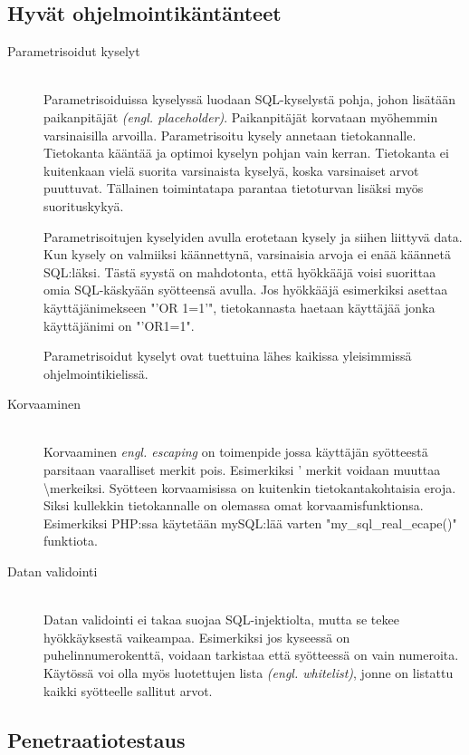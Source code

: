 \documentclass[finnish]{tktltiki2}
\theoremstyle{definition}
\theoremstyle{remark}
\begin{document}
	\subsection{Hyvät ohjelmointikäntänteet}
	\begin{description}
		\item[Parametrisoidut kyselyt ] \hfill \\
		Parametrisoiduissa kyselyssä luodaan SQL-kyselystä pohja, johon lisätään paikanpitäjät \textit{(engl. placeholder)}. Paikanpitäjät korvataan myöhemmin varsinaisilla arvoilla. Parametrisoitu kysely annetaan tietokannalle. Tietokanta kääntää ja optimoi kyselyn pohjan vain kerran. Tietokanta ei kuitenkaan vielä suorita varsinaista kyselyä, koska varsinaiset arvot puuttuvat. Tällainen toimintatapa parantaa tietoturvan lisäksi myös suorituskykyä.
		
		Parametrisoitujen kyselyiden avulla erotetaan kysely ja siihen liittyvä data. Kun kysely on valmiiksi käännettynä, varsinaisia arvoja ei enää käännetä SQL:läksi. Tästä syystä on mahdotonta, että hyökkääjä voisi suorittaa omia SQL-käskyään syötteensä avulla. Jos hyökkääjä esimerkiksi asettaa käyttäjänimekseen "'OR 1=1'", tietokannasta haetaan käyttäjää jonka käyttäjänimi on "'OR1=1".
		
		Parametrisoidut kyselyt ovat tuettuina lähes kaikissa yleisimmissä ohjelmointikielissä.
		
		\item[Korvaaminen] \hfill \\
		Korvaaminen \textit{engl. escaping} on toimenpide jossa käyttäjän syötteestä parsitaan vaaralliset merkit pois. Esimerkiksi ' merkit voidaan muuttaa \textbackslash merkeiksi. Syötteen korvaamisissa on kuitenkin tietokantakohtaisia eroja. Siksi kullekkin tietokannalle on olemassa omat korvaamisfunktionsa. Esimerkiksi PHP:ssa käytetään mySQL:lää varten "my{\_}sql{\_}real{\_}ecape()" funktiota.
		
		\item[Datan validointi]\hfill \\
		Datan validointi ei takaa suojaa SQL-injektiolta, mutta se tekee hyökkäyksestä vaikeampaa. Esimerkiksi jos kyseessä on puhelinnumerokenttä, voidaan tarkistaa että syötteessä on vain numeroita. Käytössä voi olla myös luotettujen lista \textit{(engl. whitelist)}, jonne on listattu kaikki syötteelle sallitut arvot.
		
	\end{description}
	\pagebreak
	\subsection{Penetraatiotestaus}
	
\end{document}
